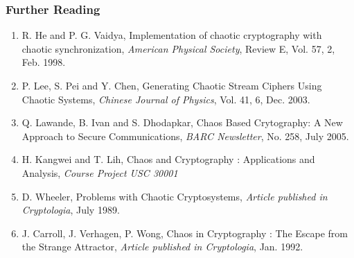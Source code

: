 \documentclass[xcolor=dvipsnames]{beamer}
\begin{document}
\begin{frame}
\frametitle{Further Reading}
\begin{enumerate}
\item
R. He and P. G. Vaidya, {Implementation of chaotic cryptography with chaotic synchronization}, {\em American Physical
Society}, Review E, Vol. 57, 2, Feb. 1998.
\newline
\item
P. Lee, S. Pei and Y. Chen, {Generating Chaotic Stream Ciphers Using Chaotic Systems}, {\em Chinese Journal of Physics},
Vol. 41, 6, Dec. 2003.
\newline
\item
Q. Lawande, B. Ivan and S. Dhodapkar, {Chaos Based Crytography: A New Approach to Secure Communications},
{\em BARC Newsletter}, No. 258, July 2005.
\newline
\item
H. Kangwei and T. Lih, {Chaos and Cryptography : Applications and Analysis}, {\em Course Project USC 30001}
\newline
\item
D. Wheeler, {Problems with Chaotic Cryptosystems}, {\em Article published in Cryptologia}, July 1989.
\newline
\item
J. Carroll, J. Verhagen, P. Wong, {Chaos in Cryptography : The Escape from the Strange Attractor},
{\em Article published in Cryptologia}, Jan. 1992.
\end{enumerate}
\end{frame}	
\end{document}
